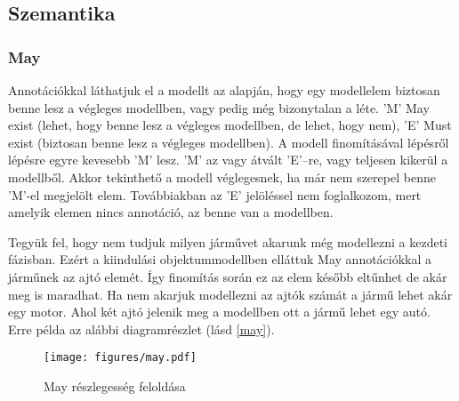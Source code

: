 \subsection{Szemantika}
\subsubsection{May}
Annotációkkal láthatjuk el a modellt az alapján, hogy egy modellelem biztosan benne lesz a végleges modellben, vagy pedig még bizonytalan a léte. \textsf{’M’} May exist (lehet, hogy benne lesz a végleges modellben, de lehet, hogy nem), \textsf{’E’} Must exist (biztosan benne lesz a végleges modellben). A modell finomításával lépésről lépésre egyre kevesebb ’M’ lesz.  \textsf{’M’} az vagy átvált \textsf{’E’}–re, vagy teljesen kikerül a modellből. Akkor tekinthető a modell véglegesnek, ha már nem szerepel benne \textsf{’M’}-el megjelölt elem. Továbbiakban az \textsf{’E’} jelöléssel nem foglalkozom, mert amelyik elemen nincs annotáció, az benne van a modellben.
\par
Tegyük fel, hogy nem tudjuk milyen járművet akarunk még modellezni a kezdeti fázisban. Ezért a kiindulási objektummodellben elláttuk May annotációkkal a járműnek az ajtó elemét. Így finomítás során ez az elem később eltűnhet de akár meg is maradhat. Ha nem akarjuk modellezni az ajtók számát a jármű lehet akár egy motor. Ahol két ajtó jelenik meg a modellben ott a jármű lehet egy autó. Erre példa az alábbi diagramrészlet (lásd \autoref{may}).

\begin{figure}[htp]
	\centering
	\texttt{[image: figures/may.pdf]}
	\caption{May részlegesség feloldása} 
	\label{may}
\end{figure}

